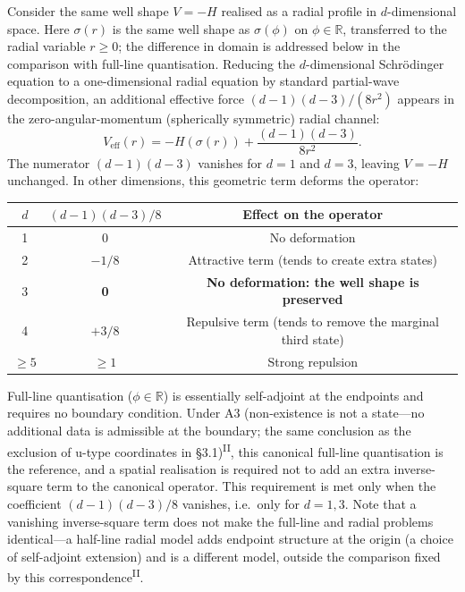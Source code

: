 \documentclass[12pt,a4paper]{article}
\newcommand{\PII}{\textsuperscript{\textup{II}}}
\begin{document}
Consider the same well shape $V = -H$ realised as a radial profile
in $d$-dimensional space.
Here $\sigma(r)$ is the same well shape as $\sigma(\phi)$ on $\phi \in \mathbb{R}$,
transferred to the radial variable $r \geq 0$; the difference in domain is
addressed below in the comparison with full-line quantisation.
Reducing the $d$-dimensional Schr\"odinger equation to a
one-dimensional radial equation by standard partial-wave
decomposition, an additional effective force
$(d{-}1)(d{-}3)/(8r^2)$ appears in the zero-angular-momentum
(spherically symmetric) radial channel:
\begin{equation}
  V_\mathrm{eff}(r) = -H(\sigma(r))
    + \frac{(d{-}1)(d{-}3)}{8r^2}.
\end{equation}
The numerator $(d{-}1)(d{-}3)$ vanishes for $d = 1$ and $d = 3$,
leaving $V = -H$ unchanged.
In other dimensions, this geometric term deforms the operator:

\begin{center}\small
\begin{tabular}{ccc}
\toprule
$d$ & $(d{-}1)(d{-}3)/8$ & Effect on the operator \\
\midrule
1 & 0 & No deformation \\
2 & $-1/8$ & Attractive term (tends to create extra states) \\
3 & \textbf{0} & \textbf{No deformation: the well shape is preserved} \\
4 & $+3/8$ & Repulsive term (tends to remove the marginal third state) \\
$\geq 5$ & $\geq 1$ & Strong repulsion \\
\bottomrule
\end{tabular}
\end{center}

\noindent
Full-line quantisation ($\phi \in \mathbb{R}$) is essentially self-adjoint at the endpoints and requires no boundary condition. Under A3 (non-existence is not a state---no additional data is admissible at the boundary; the same conclusion as the exclusion of u-type coordinates in \S 3.1)\PII{}, this canonical full-line quantisation is the reference, and a spatial realisation is required not to add an extra inverse-square term to the canonical operator. This requirement is met only when the coefficient $(d{-}1)(d{-}3)/8$ vanishes, i.e.\ only for $d = 1, 3$. Note that a vanishing inverse-square term does not make the full-line and radial problems identical---a half-line radial model adds endpoint structure at the origin (a choice of self-adjoint extension) and is a different model, outside the comparison fixed by this correspondence\PII{}.
\end{document}
